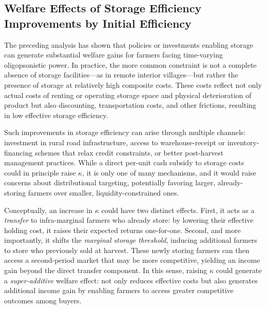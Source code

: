 








\subsection{Welfare Effects of Storage Efficiency Improvements by Initial Efficiency}
\noindent The preceding analysis has shown that policies or investments enabling storage can generate substantial welfare gains for farmers facing time-varying oligopsonistic power. In practice, the more common constraint is not a complete absence of storage facilities---as in remote interior villages---but rather the presence of storage at relatively high composite costs. These costs reflect not only actual costs of renting or operating storage space and physical deterioration of product but also discounting, transportation costs, and other frictions, resulting in low effective storage efficiency. 

Such improvements in storage efficiency can arise through multiple channels: investment in rural road infrastructure, access to warehouse-receipt or inventory-financing schemes that relax credit constraints, or better post-harvest management practices. While a direct per-unit cash subsidy to storage costs could in principle raise $\kappa$, it is only one of many mechanisms, and it would raise concerns about distributional targeting, potentially favoring larger, already-storing farmers over smaller, liquidity-constrained ones.

Conceptually, an increase in $\kappa$ could have two distinct effects. First, it acts as a \emph{transfer} to infra-marginal farmers who already store: by lowering their effective holding cost, it raises their expected returns one-for-one. Second, and more importantly, it shifts the \emph{marginal storage threshold}, inducing additional farmers to store who previously sold at harvest. These newly storing farmers can then access a second-period market that may be more competitive, yielding an income gain beyond the direct transfer component. In this sense, raising $\kappa$ could generate a \emph{super-additive} welfare effect: not only reduces effective costs but also generates additional income gain by enabling farmers to access greater competitive outcomes among buyers.

